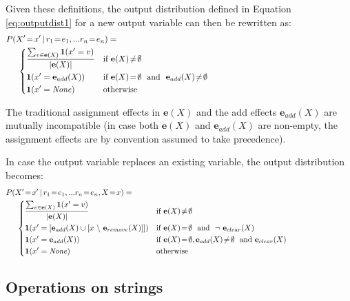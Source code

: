 Given these definitions, the output distribution defined in Equation \eqref{eq:outputdist1} for a new output variable can then be rewritten as: 
\begin{align}
&P(X'\!=\!x' \, | \, r_1\!=\!e_1,... r_n\!=\!e_n) = \hspace{10cm} \nonumber \\ & \; \; \; \; \; \begin{dcases} 
\frac{\sum_{v \in {\mathbf{e}(X)}} \mathbf{1}(x' = v)} { |\mathbf{e}(X)| }&  \text{if } \mathbf{e}(X)\!\neq\!\emptyset \\
\mathbf{1}(x' = \mathbf{e}_{add}(X))  &  \text{if } \mathbf{e}(X)\!=\!\emptyset \ \text{ and } \ \mathbf{e}_{add}(X)\!\neq\!\emptyset \\
\mathbf{1}(x' = \mathit{None}) & \text{otherwise}
\end{dcases}\label{eq:outputdist3}
\end{align}

The traditional assignment effects in $\mathbf{e}(X)$ and the add effects $\mathbf{e}_{add}(X)$ are mutually incompatible (in case both $\mathbf{e}(X)$ and $\mathbf{e}_{add}(X)$ are non-empty, the assignment effects are by convention assumed to take precedence). 

In case the output variable replaces an existing variable, the output distribution becomes:
\begin{align}
&P(X'\!=\!x' \, | \, r_1\!=\!e_1,... r_n\!=\!e_n, X\!=\!x) = \hspace{10cm} \nonumber \\ & \; \; \; \; \;  \begin{dcases} 
\frac{\sum_{v \in {\mathbf{e}(X)}} \mathbf{1}(x' = v)} { |\mathbf{e}(X)| }  & \text{if } \mathbf{e}(X)\!\neq\!\emptyset \\
\mathbf{1}(x' = \left[\mathbf{e}_{add}(X) \cup \left[x \ \backslash \ \mathbf{e}_{remove}(X)\right]\right]) & \text{if } \mathbf{e}(X)\!=\!\emptyset \ \text{ and } \ \neg \ \mathbf{e}_{clear}(X) \\
\mathbf{1}(x' = \mathbf{e}_{add}(X))  &  \text{if } \mathbf{e}(X)\!=\!\emptyset, \mathbf{e}_{add}(X)\!\neq\!\emptyset \ \text{ and }  \mathbf{e}_{clear}(X) \\
\mathbf{1}(x' = \mathit{None}) & \text{otherwise}
\end{dcases}\label{eq:outputdist4}
\end{align}


\subsection{Operations on strings}

